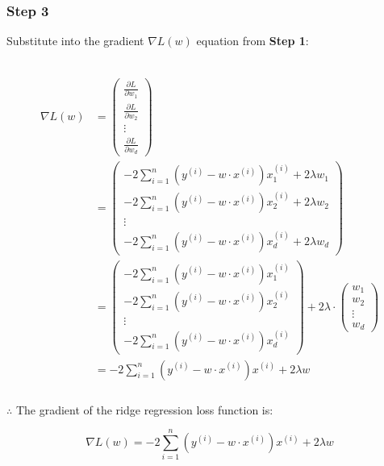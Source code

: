 \documentclass{article}
\begin{document}
\newpage

\subsubsection*{Step 3}
\parbox{\textwidth}{
Substitute into the gradient $\nabla L(w)$ equation from \textbf{Step 1}:
}\\

\begin{align*}
\nabla L(w) &= \begin{pmatrix} 
\frac{\partial L}{\partial w_1} \\
\frac{\partial L}{\partial w_2} \\
\vdots \\
\frac{\partial L}{\partial w_d}
\end{pmatrix} \\
&= \begin{pmatrix} 
-2\sum_{i=1}^{n}(y^{(i)}-w\cdot x^{(i)})x_1^{(i)} + 2\lambda w_1 \\
-2\sum_{i=1}^{n}(y^{(i)}-w\cdot x^{(i)})x_2^{(i)} + 2\lambda w_2 \\
\vdots \\
-2\sum_{i=1}^{n}(y^{(i)}-w\cdot x^{(i)})x_d^{(i)} + 2\lambda w_d
\end{pmatrix}\\
&=\begin{pmatrix} 
-2\sum_{i=1}^{n}(y^{(i)}-w\cdot x^{(i)})x_1^{(i)} \\
-2\sum_{i=1}^{n}(y^{(i)}-w\cdot x^{(i)})x_2^{(i)} \\
\vdots \\
-2\sum_{i=1}^{n}(y^{(i)}-w\cdot x^{(i)})x_d^{(i)} 
\end{pmatrix} + 2\lambda \cdot
\begin{pmatrix} 
w_1 \\
w_2 \\
\vdots \\
w_d
\end{pmatrix}\\
&=-2\sum_{i=1}^{n}(y^{(i)}-w\cdot x^{(i)})x^{(i)} + 2\lambda w
\end{align*}

\subsubsection*{\normalfont}{$\therefore$ The gradient of the ridge regression loss function is:}

$$\nabla L(w) = -2\sum_{i=1}^{n}(y^{(i)}-w\cdot x^{(i)})x^{(i)} + 2\lambda w$$\\
\end{document}
